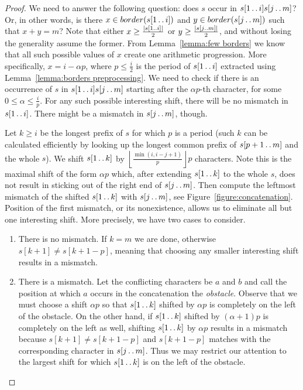 \documentclass[runningheads]{llncs}
\newcommand{\twodots}{\mathinner{\ldotp\ldotp}}
\begin{document}
\begin{proof}
We need to answer the following question: does $s$ occur in $s[1\twodots i]s[j\twodots m]$? Or, in other words, is there $x\in border(s[1\twodots i])$ and $y\in border(s[j\twodots m])$ such that $x+y=m$? Note that either $x\geq\frac{|s[1\twodots i]|}{2}$ or $y\geq\frac{|s[j\twodots m]|}{2}$, and without losing the generality assume the former. From Lemma~\ref{lemma:few borders} we know that all such possible values of $x$ create one arithmetic progression. More specifically, $x=i-\alpha p$, where $p\leq\frac{i}{2}$ is the period of $s[1\twodots i]$ extracted using Lemma~\ref{lemma:borders preprocessing}. We need to check if there is an occurrence of $s$ in $s[1\twodots i]s[j\twodots m]$ starting after the $\alpha p$-th character, for some $0\leq\alpha\leq\frac{i}{p}$. For any such possible interesting shift, there will be no mismatch in $s[1\twodots i]$. There might be a mismatch in $s[j\twodots m]$, though.

Let $k\geq i$ be the longest prefix of $s$ for which $p$ is a period (such $k$ can be calculated efficiently by looking up the longest common prefix of $s[p+1\twodots m]$ and the whole $s$). We shift $s[1\twodots k]$ by $\left\lfloor \frac{\min(i,i-j+1)}{p}\right\rfloor p$ characters. Note this is the maximal shift of the form $\alpha p$ which, after extending $s[1\twodots k]$ to the whole $s$, does not result in sticking out of the right end of $s[j\twodots m]$. Then compute the leftmost mismatch of the shifted $s[1\twodots k]$ with $s[j\twodots m]$, see Figure~\ref{figure:concatenation}. Position of the first mismatch, or its nonexistence, allows us to eliminate all but one interesting shift. More precisely, we have two cases to consider.

\begin{enumerate}

\item There is no mismatch. If $k=m$ we are done, otherwise $s[k+1]\neq s[k+1-p]$, meaning that choosing any smaller interesting shift results in a mismatch.

\item There is a mismatch. Let the conflicting characters be $a$ and $b$ and call the position at which $a$ occurs in the concatenation the {\it obstacle}. Observe that we must choose a shift $\alpha p$ so that $s[1\twodots k]$ shifted by $\alpha p$ is completely on the left of the obstacle. On the other hand, if $s[1\twodots k]$ shifted by $(\alpha + 1) p$ is completely on the left as well, shifting $s[1\twodots k]$ by $\alpha p$ results in a mismatch because $s[k+1]\neq s[k+1-p]$ and $s[k+1-p]$ matches with the corresponding character in $s[j\twodots m]$. Thus we may restrict our attention to the largest shift for which $s[1\twodots k]$ is on the left of the obstacle.


\end{enumerate}
\end{proof}
\end{document}
